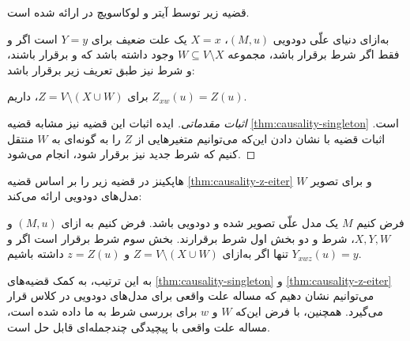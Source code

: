 قضیه زیر توسط آیتر و لوکاسویچ در
\cite{eiter2001complexity}
ارائه شده است.

\begin{theorem}
  به‌ازای دنیای علّی دودویی
  $(M,u)$،
  $X=x$
  یک علت ضعیف برای
  $Y=y$
  است اگر و فقط اگر
  شرط
  برقرار باشد،
  مجموعه
  $W \subseteq V \setminus X$
  وجود داشته باشد که
   و 
  برقرار باشند، و شرط
  نیز طبق تعریف زیر برقرار باشد:
  
  \textbf{}
    برای
    $Z=V \setminus (X \cup W)$، داریم
    $Z_{xw}(u)=Z(u)$.
\end{theorem}

\begin{proof}[اثبات مقدماتی]\label{thm:causality-z-eiter}
  ایده اثبات این قضیه نیز مشابه قضیه
  \ref{thm:causality-singleton} است.
  اثبات قضیه با نشان دادن این‌که می‌توانیم متغیرهایی از
  $Z$
  را به گونه‌ای به
  $W$
  منتقل کنیم که شرط جدید نیز برقرار شود، انجام می‌شود.
\end{proof}

هاپکینز در
\cite{hopkins2002strategies}
قضیه زیر را بر اساس قضیه
\ref{thm:causality-z-eiter}
و برای
تصویر $W$
مدل‌های دودویی ارائه می‌کند:

\begin{theorem}\label{thm:causality-z-hopkins}
  فرض کنیم
  $M$
  یک مدل علّی تصویر شده و دودویی باشد.
  فرض کنیم به ازای
  $(M,u)$ و $X,Y,W$،
  شرط
   و دو بخش اول شرط 
  برقرارند. بخش سوم شرط
  برقرار است اگر و تنها اگر به‌ازای
  $Z=V \setminus (X \cup W)$ و $z=Z(u)$
  داشته باشیم
  $Y_{xwz}(u)=y$.
\end{theorem}

به این ترتیب، به کمک قضیه‌های
\ref{thm:causality-singleton} و \ref{thm:causality-z-eiter}
می‌توانیم نشان دهیم که
مساله علت واقعی برای مدل‌های دودویی در کلاس
قرار می‌گیرد. همچنین، با فرض این‌که
$W$ و $w$
برای بررسی شرط
به ما داده شده است، مساله علت واقعی
با پیچیدگی چندجمله‌ای قابل حل است.